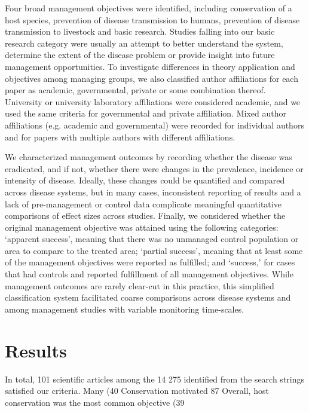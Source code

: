 Four broad management objectives were identified, including conservation of a host species, prevention of disease transmission to humans, prevention of disease transmission to livestock and basic research.
Studies falling into our basic research category were usually an attempt to better understand the system, determine the extent of the disease problem or provide insight into future management opportunities.
To investigate differences in theory application and objectives among managing groups, we also classified author affiliations for each paper as academic, governmental, private or some combination thereof.
University or university laboratory affiliations were considered academic, and we used the same criteria for governmental and private affiliation. Mixed author affiliations (e.g. academic and governmental) were recorded for individual authors and for papers with multiple authors with different affiliations.

We characterized management outcomes by recording whether the disease was eradicated, and if not, whether there were changes in the prevalence, incidence or intensity of disease.
Ideally, these changes could be quantified and compared across disease systems, but in many cases, inconsistent reporting of results and a lack of pre-management or control data complicate meaningful quantitative comparisons of effect sizes across studies.
Finally, we considered whether the original management objective was attained using the following categories: ‘apparent success’, meaning that there was no unmanaged control population or area to compare to the treated area; ‘partial success’, meaning that at least some of the management objectives were reported as fulfilled; and ‘success,’ for cases that had controls and reported fulfillment of all management objectives.
While management outcomes are rarely clear-cut in this practice, this simplified classification system facilitated coarse comparisons across disease systems and among management studies with variable monitoring time-scales.

\section{Results}

In total, 101 scientific articles among the 14 275 identified from the search strings satisfied our criteria.
Many (40%
Conservation motivated 87%
Overall, host conservation was the most common objective (39%

